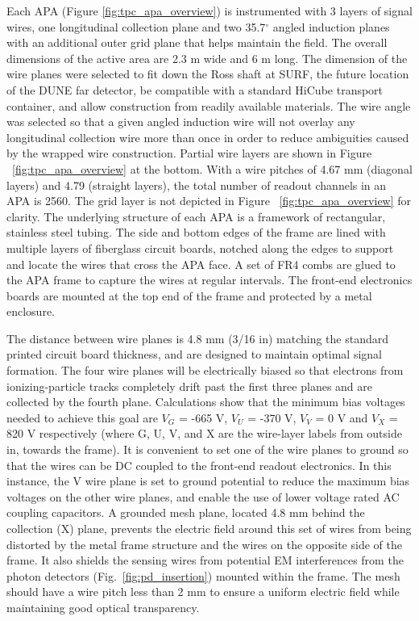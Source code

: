 Each APA (Figure \ref{fig:tpc_apa_overview}) is instrumented with 3 layers of signal wires, one longitudinal collection plane and two 35.7$^\circ$ angled induction planes with an additional outer grid plane that helps maintain the field. 
The overall dimensions of the active area are 2.3 m wide and 6 m long. The dimension of the wire planes were selected to fit down the Ross shaft at SURF, the future location of the DUNE far detector, be compatible with a standard HiCube transport container, and allow construction from readily available materials.  The wire angle was selected so that a given angled induction wire will not overlay any longitudinal collection wire more than once in order to reduce ambiguities caused by the wrapped wire construction. Partial wire layers are shown in 
Figure ~\ref{fig:tpc_apa_overview} at the bottom.  With a wire pitches of 4.67 mm (diagonal layers) and 4.79 (straight layers), the total number of readout channels in an APA is 2560.
The grid layer is not depicted in Figure ~\ref{fig:tpc_apa_overview} for clarity. The underlying structure of each APA is a framework of rectangular, stainless steel tubing.  The side and bottom edges of the frame are lined with multiple layers of fiberglass circuit boards, notched along the edges to support and locate the wires that cross the APA face. A set of FR4 combs are glued to the APA frame to capture the wires at regular intervals. The front-end electronics boards are mounted at the top end of the frame and protected by a metal enclosure. 


The distance between wire planes is 4.8 mm (3/16 in) matching the standard printed circuit board thickness, and are designed to maintain optimal signal formation. The four wire planes will be electrically biased so that electrons from ionizing-particle tracks completely drift past the first three planes and are collected by the fourth plane. Calculations show that the minimum bias voltages needed to achieve this goal are $V_G$ = -665 V, $V_U$ = -370 V, $V_V$ = 0 V and $V_X$ = 820 V respectively (where G, U, V, and X are the wire-layer labels from outside in, towards the frame).  It is convenient to set one of the wire planes to ground so that the wires can be DC coupled to the front-end readout electronics. In this instance, the V wire plane is set to ground potential to reduce the maximum bias voltages on the other wire planes, and enable the use of lower voltage rated AC coupling capacitors. A grounded mesh plane, located 4.8 mm behind the collection (X) plane, prevents the electric field around this set of wires from being distorted by the metal frame structure and the wires on the opposite side of the frame. It also shields the sensing wires from potential EM interferences from the photon detectors (Fig.~\ref{fig:pd_insertion}) mounted within the frame. The mesh should have a wire pitch less than 2 mm to ensure a uniform electric field while maintaining good optical transparency.


